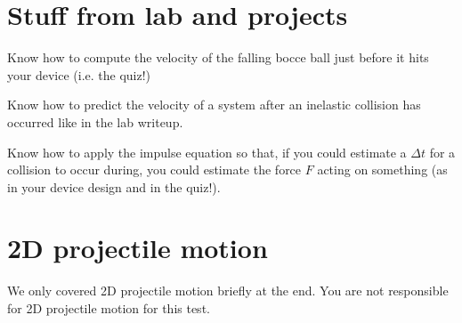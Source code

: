 \documentclass [handout]{tufte-handout}
\begin{document}
\section{Stuff from lab and projects}
Know how to compute the velocity of the falling bocce ball just before it hits your device (i.e. the quiz!)

Know how to predict the velocity of a system after an inelastic collision has occurred like in the lab writeup. 

Know how to apply the impulse equation so that, if you could estimate a $\Delta t$ for a collision to occur during, you could estimate the force $F$ acting on something (as in your device design and in the quiz!). 

\section{2D projectile motion}
We only covered 2D projectile motion briefly at the end. You are not responsible for 2D projectile motion for this test. 
\end{document}
